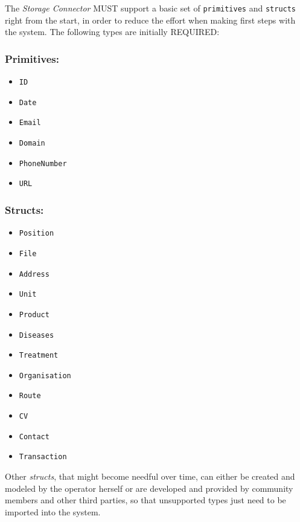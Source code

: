 \documentclass[12pt,english,a4paper,titlepage,cleardoublepage=empty,dottedtoc]{report}
\providecommand{\tightlist}{%
  \setlength{\itemsep}{0pt}\setlength{\parskip}{0pt}}
\begin{document}
The \emph{Storage Connector} MUST support a basic set of
\texttt{primitives} and \texttt{structs} right from the start, in order
to reduce the effort when making first steps with the system. The
following types are initially REQUIRED:

\subsubsection*{Primitives:}\label{primitives}

\begin{itemize}
\tightlist
\item
  \texttt{ID}
\item
  \texttt{Date}
\item
  \texttt{Email}
\item
  \texttt{Domain}
\item
  \texttt{PhoneNumber}
\item
  \texttt{URL}
\end{itemize}

\subsubsection*{Structs:}\label{structs}

\begin{itemize}
\tightlist
\item
  \texttt{Position}
\item
  \texttt{File}
\item
  \texttt{Address}
\item
  \texttt{Unit}
\item
  \texttt{Product}
\item
  \texttt{Diseases}
\item
  \texttt{Treatment}
\item
  \texttt{Organisation}
\item
  \texttt{Route}
\item
  \texttt{CV}
\item
  \texttt{Contact}
\item
  \texttt{Transaction}
\end{itemize}

Other \emph{structs}, that might become needful over time, can either be
created and modeled by the operator herself or are developed and
provided by community members and other third parties, so that
unsupported types just need to be imported into the system.
\end{document}
